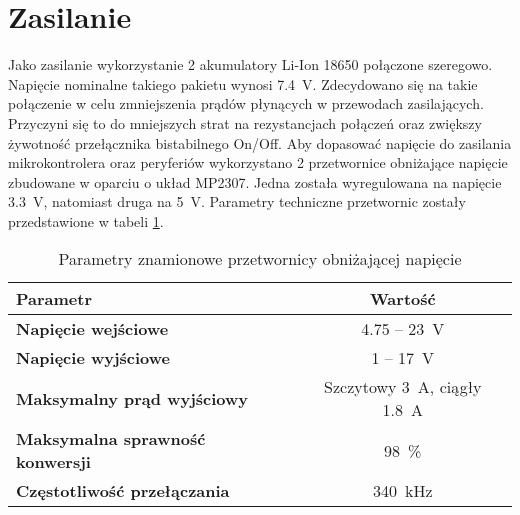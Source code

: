 	\section{Zasilanie}
	
		Jako zasilanie wykorzystanie 2 akumulatory Li-Ion 18650 połączone szeregowo. Napięcie nominalne takiego pakietu wynosi \SI{7.4}{\volt}. Zdecydowano się na takie połączenie w celu zmniejszenia prądów płynących w przewodach zasilających. Przyczyni się to do mniejszych strat na rezystancjach połączeń oraz zwiększy żywotność przełącznika bistabilnego On/Off. Aby dopasować napięcie do zasilania mikrokontrolera oraz peryferiów wykorzystano 2 przetwornice obniżające napięcie zbudowane w oparciu o układ MP2307. Jedna została wyregulowana na napięcie \SI{3.3}{\volt}, natomiast druga na \SI{5}{\volt}. Parametry techniczne przetwornic zostały przedstawione w tabeli \ref{tab:PrzetwornicaStepDown}.
		
		\begin{table}[H]
			\centering
			\begin{tabular}{|l|c|} \hline
				\textbf{Parametr} & Wartość \\
				\hline
				\hline  \textbf{Napięcie wejściowe}& 4.75 -- \SI{23}{\volt}  \\
				\hline 	\textbf{Napięcie wyjściowe} & 1 -- \SI{17}{\volt} \\
				\hline 	\textbf{Maksymalny prąd wyjściowy}& Szczytowy \SI{3}{\ampere}, ciągły \SI{1.8}{\ampere} \\
				\hline 	\textbf{Maksymalna sprawność konwersji}& \SI{98}{\percent} \\
				\hline 	\textbf{Częstotliwość przełączania}& \SI{340}{\kHz} \\
				\hline
			\end{tabular}
			\caption{Parametry znamionowe przetwornicy obniżającej napięcie}
			\label{tab:PrzetwornicaStepDown}
		\end{table}
	
